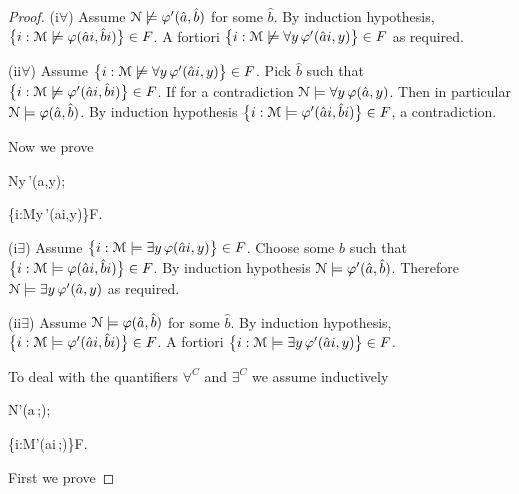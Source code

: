 \documentclass[12pt,letterpaper,oneside,reqno]{amsart}
\theoremstyle{plain}
\theoremstyle{remark}
\begin{document}
\begin{proof}
  (\textsf{i}$\forall$)
  Assume ${\EuScript N}\not\models\varphi'(\hat a,\hat b)$ for some $\hat b$.
  By induction hypothesis, $\big\{ i: {\EuScript M}\not\models\varphi(\hat ai,\hat bi)\big\}\in F$.
  A fortiori $\big\{ i:{\EuScript M}\not\models\forall y\,\varphi'(\hat ai,y)\big\}\in F$ as required.


  (\textsf{ii}$\forall$)
  Assume $\big\{ i:{\EuScript M}\not\models\forall y\,\varphi'(\hat ai,y)\big\}\in F$.
  Pick $\hat b$ such that $\big\{ i:{\EuScript M}\not\models\varphi'(\hat ai,\hat bi)\big\}\in F$.
  If for a contradiction ${\EuScript N}\models\forall y\,\varphi(\hat a,y)$.
  Then in particular ${\EuScript N}\models\varphi(\hat a,\hat b)$.
  By induction hypothesis $\big\{ i:{\EuScript M}\models\varphi'(\hat ai,\hat bi)\big\}\in F$, a contradiction.

  Now we prove

  {\Rightarrow}
  {{\EuScript N}\models\exists y\,\varphi'(\hat a,y)};

  {\Rightarrow}
  {\big\{i:{\EuScript M}\models\exists y\,\varphi'(\hat ai,y)\big\}\in F}.


  (\textsf{i}$\exists$) Assume $\big\{ i:{\EuScript M}\models\exists y\,\varphi(\hat ai,y)\big\}\in F$.
  Choose some $\hat b$ such that $\big\{ i:{\EuScript M}\models\varphi(\hat ai,\hat bi)\big\}\in F$.
  By induction hypothesis ${\EuScript N}\models\varphi'(\hat a,\hat b)$.
  Therefore ${\EuScript N}\models\exists y\,\varphi'(\hat a,y)$ as required.

  (\textsf{ii}$\exists$) Assume ${\EuScript N}\models\varphi(\hat a,\hat b)$ for some $\hat b$.
  By induction hypothesis, $\big\{ i: {\EuScript M}\models\varphi'(\hat ai,\hat bi)\big\}\in F$.
  A fortiori $\big\{ i:{\EuScript M}\models\exists y\,\varphi'(\hat ai,y)\big\}\in F$.
  
  To deal with the quantifiers $\forall^C$ and $\exists^C$ we assume inductively

  {\Rightarrow}
  {{\EuScript N}\models\varphi'(\hat a\,;\alpha)};

  {\Rightarrow}
  {\big\{i:{\EuScript M}\models\varphi'(\hat ai\,;\alpha)\big\}\in F}.
    
  First we prove
  

\end{proof}
\end{document}
